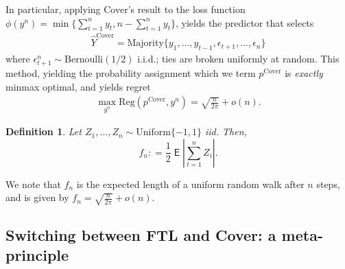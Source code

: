 \documentclass[11pt,letter]{article}
\newtheorem{definition}{Definition}
\newcommand{\Ber}{\mathrm{Bernoulli}}
\newcommand{\Unif}{\mathrm{Uniform}}
\newcommand{\defeq}{\mathrel{\mathop{:}}=}
\newcommand{\e}{\epsilon}
\newcommand{\Reg}{\mathrm{Reg}}
\newcommand{\pcov}{p^{\mathrm{Cover}}}
\newcommand{\ycov}{\widehat{Y}^{\mathrm{Cover}}}
\DeclareMathOperator\E{\textsf{E}}
\begin{document}
In particular, applying Cover's result to the loss function $\phi(y^n) = \min\{\sum_{t=1}^n y_t, n - \sum_{t=1}^n y_t\}$, yields the predictor that selects 
\begin{align}\label{eq:CoverPredictor}
   \ycov = \mathrm{Majority}\{y_1,\dotsc,y_{t-1},\e_{t+1},\dotsc,\e_n\}
\end{align}
where $\e_{t+1}^n \sim \Ber(1/2)$ i.i.d.; ties are broken uniformly at random. This method, yielding the probability assignment which we term $\pcov$ is \emph{exactly} minmax optimal, and yields regret 
\begin{align}\label{eq:CoverRegret}
   \max_{y^n} \Reg(\pcov,y^n) = \sqrt{\frac{n}{2 \pi}} + o(n).
\end{align}

\begin{definition}\label{def:SumOfRademachers}
Let $Z_1,\dotsc,Z_n \sim \Unif\{-1,1\}$ iid. Then,
\[
f_n \defeq \frac{1}{2} \E\left|\sum_{t=1}^n Z_i\right|.
\]  
\end{definition}
We note that $f_n$ is the expected length of a uniform random walk after $n$ steps, and is given by $f_n = \sqrt{\frac{n}{2 \pi}} + o(n)$. 
\subsection{Switching between FTL and Cover: a meta-principle}
\end{document}
